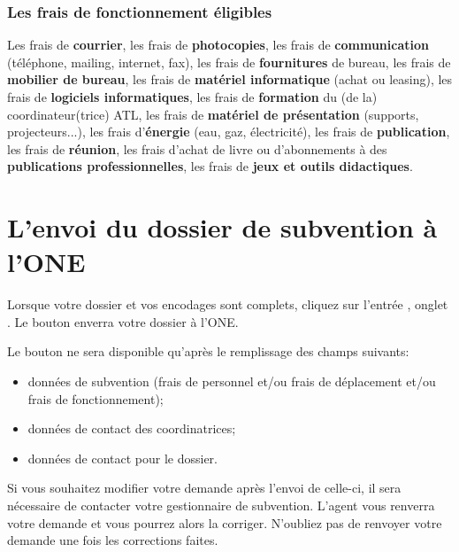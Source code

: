 \subsubsection{Les frais de fonctionnement éligibles}

Les frais de \textbf{courrier}, les frais de \textbf{photocopies}, les frais de \textbf{communication} (téléphone, mailing, internet, fax), les frais de \textbf{fournitures} de bureau,
les frais de \textbf{mobilier de bureau}, les frais de \textbf{matériel informatique} (achat ou leasing), les frais de \textbf{logiciels informatiques}, les frais de \textbf{formation} du (de la) coordinateur(trice) ATL, les frais de \textbf{matériel de présentation} (supports, projecteurs...), les frais d’\textbf{énergie} (eau, gaz, électricité), les frais de \textbf{publication}, les frais de \textbf{réunion}, les frais d’achat de livre ou d’abonnements à des \textbf{publications professionnelles}, les frais de \textbf{jeux et outils didactiques}.



\section{L'envoi du dossier de subvention à l'ONE}
Lorsque votre dossier et vos encodages sont complets, cliquez sur l'entrée , onglet . Le bouton  enverra votre dossier à l'ONE. 


Le bouton ne sera disponible qu'après le remplissage des champs suivants:
\begin{itemize}
    \item données de subvention (frais de personnel et/ou frais de déplacement et/ou frais de fonctionnement);
    \item données de contact des coordinatrices;
    \item données de contact pour le dossier.
\end{itemize}



\begin{information}
Si vous souhaitez modifier votre demande après l'envoi de celle-ci, il sera nécessaire de contacter votre gestionnaire de subvention. L'agent vous renverra votre demande et vous pourrez alors la corriger. N'oubliez pas de renvoyer votre demande une fois les corrections faites.  
\end{information}







